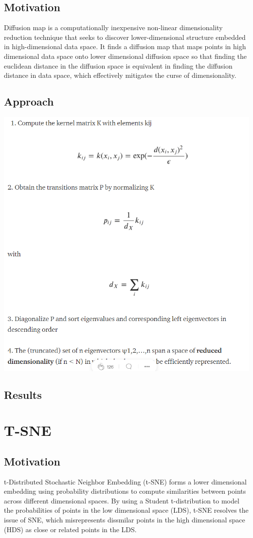 \documentclass[12pt]{article}
\begin{document}
\subsection{Motivation}
Diffusion map is a computationally inexpensive non-linear dimensionality reduction technique that seeks to discover lower-dimensional structure embedded in high-dimensional data space. It finds a diffusion map that maps points in high dimensional data space onto lower dimensional diffusion space so that finding the euclidean distance in the diffusion space is equivalent in finding the diffusion distance in data space, which effectively mitigates the curse of dimensionality.
\subsection{Approach}
\includegraphics[scale=0.5]{algo.png}
\subsection{Results}

\section{T-SNE} \label{sec: T-SNE}
\subsection{Motivation}
\hspace{5mm}t-Distributed Stochastic Neighbor Embedding (t-SNE) forms a lower dimensional embedding using probability distributions to compute similarities between points across different dimensional spaces. By using a Student t-distribution to model the probabilities of points in the low dimensional space (LDS), t-SNE resolves the issue of SNE, which misrepresents dissmilar points in the high dimensional space (HDS) as close or related points in the LDS.
\end{document}

